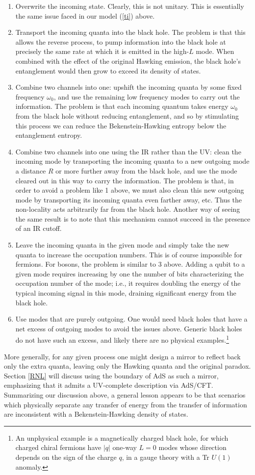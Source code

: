 \documentclass[12pt]{article}
\begin{document}
\begin{enumerate}
\item
Overwrite the incoming state.  Clearly, this is not unitary.  This is essentially the same issue faced in our model (\ref{ti}) above.
\item
Transport the incoming quanta into the black hole.  The problem is that this allows the reverse process, to pump information into the black hole at precisely the same rate at which it is emitted in the high-$L$ mode.  When combined with the effect of the original Hawking emission, the black hole's entanglement would then grow to exceed its density of states.
\item
Combine two channels into one: upshift the incoming quanta by some fixed frequency $\omega_0$, and use the remaining low frequency modes to carry out the information.  The problem is that each incoming quantum takes energy $\omega_0$ from the black hole without reducing entanglement, and so by stimulating this process we can reduce the Bekenstein-Hawking entropy below the entanglement entropy.
\item
Combine two channels into  one using the IR rather than the UV: clean the incoming mode by transporting the incoming quanta to a new outgoing mode a distance $R$ or more further away from the black hole, and use the mode cleared out in this way to carry the information.  The problem is that, in order to avoid a problem like 1 above, we must also clean this new outgoing mode by transporting its incoming quanta even farther away, etc.  Thus the non-locality acts arbitrarily far from the black hole.  Another way of seeing the same result is to note that this mechanism cannot succeed in the presence of an IR cutoff.
\item
Leave the incoming quanta in the given mode and simply take the new quanta to increase the occupation numbers.  This is of course impossible for fermions.  For bosons, the problem is similar to 3 above.  Adding a qubit to a given mode requires increasing by one the number of bits characterizing the occupation number of the mode; i.e., it requires doubling the energy of the typical incoming signal in this mode, draining significant energy from the black hole.
\item
Use modes that are purely outgoing.  One would need black holes that have a net excess of outgoing modes to avoid the issues above.  Generic black holes do not have such an excess, and likely there are no physical examples.\footnote{An unphysical example is a magnetically charged black hole, for which charged chiral fermions have $|q|$ one-way $L=0$ modes whose direction depends on the sign of the charge $q$,  in a gauge theory with a Tr $U(1)$ anomaly.}
\end{enumerate}
More generally, for any given process one might design a mirror to reflect back only the extra quanta, leaving only the Hawking quanta and the original paradox.  Section \ref{RNL} will discuss using the boundary of AdS as such a mirror, emphasizing that it admits a UV-complete description via AdS/CFT. Summarizing our discussion above, a general lesson appears to be that scenarios which physically separate any transfer of energy from the transfer of information are inconsistent with a Bekenstein-Hawking density of states.
\end{document}
